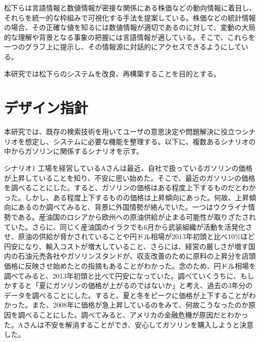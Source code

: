 \documentclass{matsushita-zemi}
\begin{document}
松下らは言語情報と数値情報が密接な関係にある株価などの動向情報に着目し、それらを統一的な枠組みで可視化する手法を提案している\cite{Elucignage-jsai}\cite{Elucignage}。株価などの統計情報の場合、その正確な値を知るには数値情報が適切であるのに対して、変動の大局的な理解や背景となる事象の把握には言語情報が適している。そこで、これらを一つのグラフ上に提示し、その情報源に対話的にアクセスできるようにしている。

本研究では松下らのシステムを改良、再構築することを目的とする。

\section{デザイン指針}
本研究では、既存の検索技術を用いてユーザの意思決定や問題解決に役立つシナリオを想定し、システムに必要な機能を整理する。以下に、複数あるシナリオの中からガソリンに関係するシナリオを示す。
\begin{itembox}[l]{シナリオ1}
工場を経営しているAさんは最近、自社で扱っているガソリンの価格が上昇していることを知り、不安に思い始めた。そこで、最近のガソリンの価格を調べることにした。すると、ガソリンの価格はある程度上下するものだとわかった。しかし、ある程度上下するものの価格は上昇傾向にあった。何故、上昇傾向にあるのか調べてみると、背景に外国情勢が絡んでいた。一つはウクライナ情勢である。産油国のロシアから欧州への原油供給が止まる可能性が取りざたされていた。さらに、同じく産油国のイラクでも6月から武装組織が活動を活発化させ、原油の供給が脅かされていることや円ドル相場が2013年初頭と比べ10\%ほど円安になり、輸入コストが増大していること、さらには、経営の厳しさが増す国内の石油元売各社やガソリンスタンドが、収支改善のために原料の上昇分を店頭価格に反映させ始めたとの指摘もあることがわかった。念のため、円ドル相場を調べてみると、2013年初頭と比べて円安になっていた。調べていくうちに、もしかすると「夏にガソリンの価格が上がるのではないか」と考え、過去の3年分のデータを調べることにした。すると、夏と冬をピークに価格が上下することがわかった。また、2008年に価格が急上昇しているのをみて、何故こうなったのか原因を調べることにした。調べてみると、アメリカの金融危機が原因だとわかった。Aさんは不安を解消することができ、安心してガソリンを購入しようと決意した。
\end{itembox}
\end{document}
